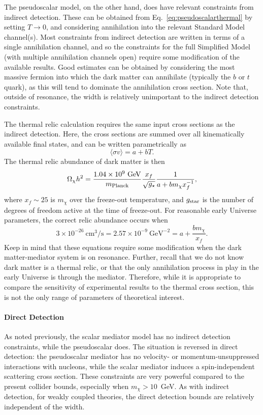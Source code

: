 The pseudoscalar model, on the other hand, does have relevant constraints from indirect detection. These can be obtained from Eq.~\ref{eq:pseudoscalarthermal} by setting $T \to 0$, and considering annihilation into the relevant Standard Model channel(s). Most constraints from indirect detection are written in terms of a single annihilation channel, and so the constraints for the full Simplified Model (with multiple annihilation channels open) require some modification of the available results. Good estimates can be obtained by considering the most massive fermion into which the dark matter can annihilate (typically the $b$ or $t$ quark), as this will tend to dominate the annihilation cross section. Note that, outside of resonance, the width is relatively unimportant to the indirect detection constraints.

The thermal relic calculation requires the same input cross sections as the indirect detection. Here, the cross sections are summed over all kinematically available final states, and can be written parametrically as
\[
\langle \sigma v\rangle = a + bT. 
\]
The thermal relic abundance of dark matter is then
\begin{equation}
\Omega_\chi h^2 = \frac{1.04\times 10^9~\mbox{GeV}}{m_{\rm Planck}}\frac{x_f}{\sqrt{g_\star}}\frac{1}{a+b m_\chi x_f^{-1}},
\end{equation}
where $x_f \sim 25$ is $m_\chi$ over the freeze-out temperature, and $g_{\rm star}$ is the number of degrees of freedom active at the time of freeze-out. For reasonable early Universe parameters, the correct relic abundance occurs when
\begin{equation}
3 \times 10^{-26}~\mbox{cm$^3$/s} = 2.57 \times 10^{-9}~\mbox{GeV}^{-2} = a + \frac{b m_\chi}{x_f}.
\end{equation}
Keep in mind that these equations require some modification when the dark matter-mediator system is on resonance. Further, recall that we do not know dark matter is a thermal relic, or that the only annihilation process in play in the early Universe is through the mediator. Therefore, while it is appropriate to compare the sensitivity of experimental results to the thermal cross section, this is not the only range of parameters of theoretical interest.

\paragraph{Direct Detection}

As noted previously, the scalar mediator model has no indirect detection constraints, while the pseudoscalar does. The situation is reversed in direct detection: the pseudoscalar mediator has no velocity- or momentum-unsuppressed interactions with nucleons, while the scalar mediator induces a spin-independent scattering cross section. These constraints are very powerful compared to the present collider bounds, especially when $m_\chi > 10$~GeV. As with indirect detection, for weakly coupled theories, the direct detection bounds are relatively independent of the width. 

